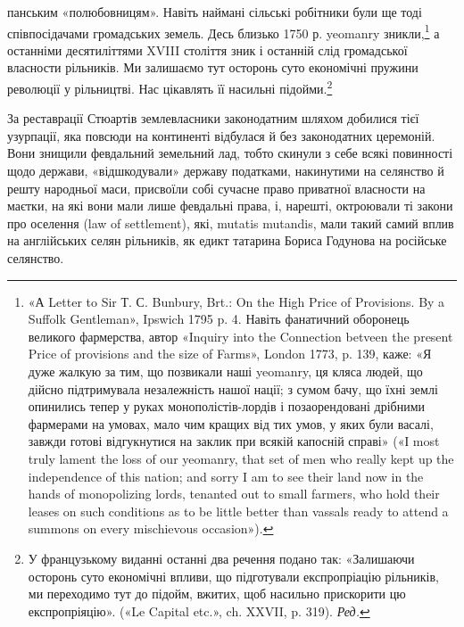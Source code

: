 \parcont{}  %
панським «полюбовницям». Навіть наймані сільські робітники
були ще тоді співпосідачами громадських земель. Десь близько
1750 р. yeomanry зникли,\footnote{
«А Letter to Sir Т. С. Bunbury, Brt.: On the High Price of Provisions.
By a Suffolk Gentleman», Ipswich 1795 p. 4. Навіть фанатичний
оборонець великого фармерства, автор «Inquiry into the Connection
betveen the present Price of provisions and the size of Farms», London
1773, p. 139, каже: «Я дуже жалкую за тим, що позвикали наші yeomanry,
ця кляса людей, що дійсно підтримувала незалежність нашої нації;
з сумом бачу, що їхні землі опинились тепер у руках монополістів-лордів
і позаорендовані дрібними фармерами на умовах, мало чим кращих від
тих умов, у яких були васалі, завжди готові відгукнутися на заклик при
всякій капосній справі» («І most truly lament the loss of our yeomanry, that
set of men who really kept up the independence of this nation; and sorry I am
to see their land now in the hands of monopolizing lords, tenanted out to
small farmers, who hold their leases on such conditions as to be little better
than vassals ready to attend a summons on every mischievous occasion»).
} а останніми десятиліттями XVIII
століття зник і останній слід громадської власности рільників.
Ми залишаємо тут осторонь суто економічні пружини революції
у рільництві. Нас цікавлять її насильні підойми.\footnote*{
У французькому виданні останні два речення подано так:
«Залишаючи осторонь суто економічні впливи, що підготували експропріацію
рільників, ми переходимо тут до підойм, вжитих, щоб насильно
прискорити цю експропріяцію». («Le Capital etc.», ch. XXVII,
p. 319). \emph{Ред.}
}

За реставрації Стюартів землевласники законодатним шляхом
добилися тієї узурпації, яка повсюди на континенті відбулася й
без законодатних церемоній. Вони знищили февдальний земельний
лад, тобто скинули з себе всякі повинності щодо держави,
«відшкодували» державу податками, накинутими на селянство
й решту народньої маси, присвоїли собі сучасне право приватної
власности на маєтки, на які вони мали лише февдальні права,
і, нарешті, октроювали ті закони про оселення (law of settlement),
які, mutatis mutandis, мали такий самий вплив на англійських
селян рільників, як едикт татарина Бориса Годунова на російське
селянство.

